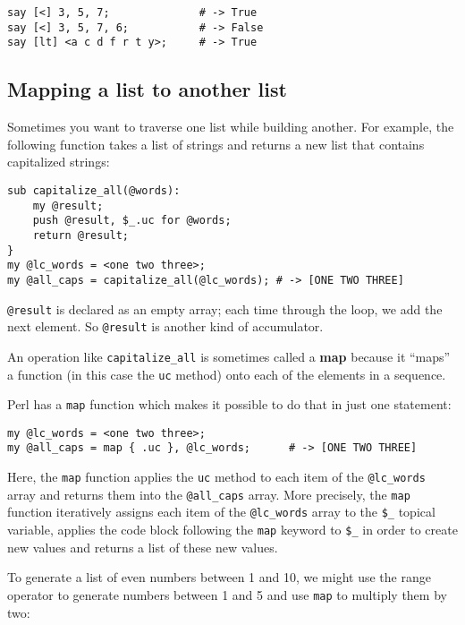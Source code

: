\begin{verbatim}
say [<] 3, 5, 7;              # -> True
say [<] 3, 5, 7, 6;           # -> False
say [lt] <a c d f r t y>;     # -> True
\end{verbatim}

\subsection{Mapping a list to another list}

Sometimes you want to traverse one list while building
another.  For example, the following function takes a list 
of strings and returns a new list that contains capitalized 
strings:

\begin{verbatim}
sub capitalize_all(@words):
    my @result;
    push @result, $_.uc for @words;
    return @result;
}
my @lc_words = <one two three>;
my @all_caps = capitalize_all(@lc_words); # -> [ONE TWO THREE]
\end{verbatim}
%
\verb'@result' is declared as an empty array; each time through
the loop, we add the next element.  So \verb'@result' is 
another kind of accumulator.

An operation like \verb"capitalize_all" is sometimes called a {\bf map} because it ``maps'' a function (in this case the {\tt uc} method) onto each of the elements in a sequence.

Perl has a {\tt map} function which makes it possible to 
do that in just one statement:

\begin{verbatim}
my @lc_words = <one two three>;
my @all_caps = map { .uc }, @lc_words;      # -> [ONE TWO THREE]
\end{verbatim}
%

Here, the {\tt map} function applies the {\tt uc} method to 
each item of the \verb'@lc_words' array and returns them 
into the \verb'@all_caps' array. More precisely, the {\tt map} 
function iteratively assigns each item of the \verb'@lc_words' 
array to the \verb'$_' topical variable, applies the 
code block following the {\tt map} keyword to \verb'$_' in 
order to create new values and returns a list of these new 
values.

To generate a list of even numbers between 1 and 10, we 
might use the range operator to generate numbers 
between 1 and 5 and use {\tt map} to multiply them by two:

